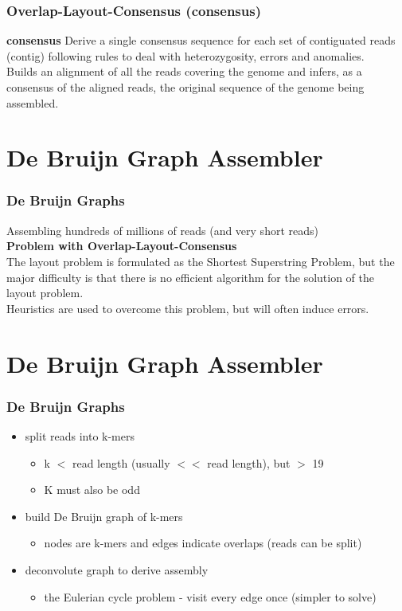 \documentclass[pdf]{beamer}
\begin{document}
\begin{frame}
\frametitle{Overlap-Layout-Consensus (consensus)}
\textbf{consensus}
Derive a single consensus sequence for each set of contiguated reads (contig) following rules to deal with heterozygosity, errors and anomalies.\\
Builds an alignment of all the reads covering the genome and infers, as a consensus of the aligned reads, the original sequence of the genome being assembled.
\end{frame}

\section{De Bruijn Graph Assembler}
\begin{frame}
\frametitle{De Bruijn Graphs}
Assembling hundreds of millions of reads (and very short reads)\\
\vspace{0.2in}
\textbf{Problem with Overlap-Layout-Consensus}\\
The layout problem is formulated as the Shortest Superstring Problem, but the major difficulty is that there is no efficient algorithm for the solution of the layout problem.\\
\vspace{0.2in}
Heuristics are used to overcome this problem, but will often induce errors.
\end{frame}

\section{De Bruijn Graph Assembler}
\begin{frame}
\frametitle{De Bruijn Graphs}
\begin{itemize}
\item split reads into k-mers
\begin{itemize}
\item k $<$ read length (usually $<<$ read length), but $>$ 19
\item K must also be odd
\end{itemize}
\item build De Bruijn graph of k-mers
\begin{itemize}
\item nodes are k-mers and edges indicate overlaps (reads can be split)
\end{itemize}
\item deconvolute graph to derive assembly
\begin{itemize}
\item the Eulerian cycle problem - visit every edge once (simpler to solve)
\end{itemize}
\end{itemize}

\end{frame}
\end{document}
